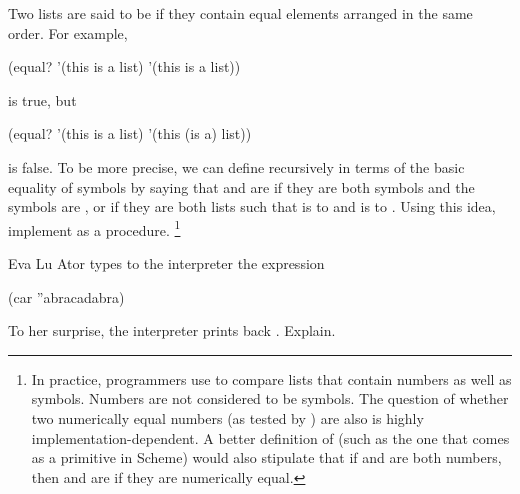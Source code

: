 \begin{exercise}
	\label{Exercise 2.54}
	Two lists are said to be  if they contain equal elements arranged in the same order.
	For example,
	\begin{scheme}
	  (equal? '(this is a list) '(this is a list))
	\end{scheme}
	is true, but
	\begin{scheme}
	  (equal? '(this is a list) '(this (is a) list))
	\end{scheme}
	is false.
	To be more precise, we can define   recursively in terms of the basic  equality of symbols by saying that  and  are  if they are both symbols and the symbols are , or if they are both lists such that  is  to  and  is  to .
	Using this idea, implement  as a procedure.%
	\footnote{
		In practice, programmers use  to compare lists that contain numbers as well as symbols.
		Numbers are not considered to be symbols.
		The question of whether two numerically equal numbers (as tested by \code{=}) are also  is highly implementation-dependent.
		A better definition of  (such as the one that comes as a primitive in Scheme) would also stipulate that if  and  are both numbers, then  and  are  if they are numerically equal.
	}
\end{exercise}



\begin{exercise}
	\label{Exercise 2.55}
	Eva Lu Ator types to the interpreter the expression
	\begin{scheme}
	  (car ''abracadabra)
	\end{scheme}
	To her surprise, the interpreter prints back .
	Explain.
\end{exercise}
